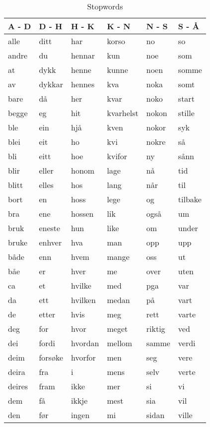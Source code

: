 \begin{table}[htbp] \footnotesize \center
\caption{Stopwords\label{tab:stopwords}}
\begin{tabular}{l l l l l l}
    \toprule
    A - D & D - H & H - K & K - N & N - S & S - Å \\
    \midrule
    alle & ditt & har & korso & no & so \\
    andre & du & hennar & kun & noe & som \\
    at & dykk & henne & kunne & noen & somme \\
    av & dykkar & hennes & kva & noka & somt \\
    bare & då & her & kvar & noko & start \\
    begge & eg & hit & kvarhelst & nokon & stille \\
    ble & ein & hjå & kven & nokor & syk \\
    blei & eit & ho & kvi & nokre & så \\
    bli & eitt & hoe & kvifor & ny & sånn \\
    blir & eller & honom & lage & nå & tid \\
    blitt & elles & hos & lang & når & til \\
    bort & en & hoss & lege & og & tilbake \\
    bra & ene & hossen & lik & også & um \\
    bruk & eneste & hun & like & om & under \\
    bruke & enhver & hva & man & opp & upp \\
    både & enn & hvem & mange & oss & ut \\
    båe & er & hver & me & over & uten \\
    ca & et & hvilke & med & pga & var \\
    da & ett & hvilken & medan & på & vart \\
    de & etter & hvis & meg & rett & varte \\
    deg & for & hvor & meget & riktig & ved \\
    dei & fordi & hvordan & mellom & samme & verdi \\
    deim & forsøke & hvorfor & men & seg & vere \\
    deira & fra & i & mens & selv & verte \\
    deires & fram & ikke & mer & si & vi \\
    dem & få & ikkje & mest & sia & vil \\
    den & før & ingen & mi & sidan & ville \\

\end{tabular}
\end{table}

